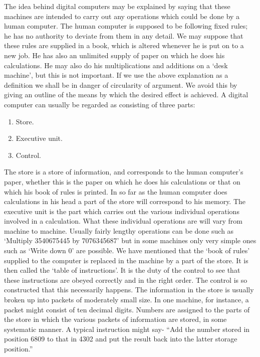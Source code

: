 \documentclass[10pt]{article} %
\begin{document}
The idea behind digital computers may be explained by saying that these machines are intended to carry out any operations which could be done by a human computer. The human computer is supposed to be following fixed rules; he has no authority to deviate from them in any detail. We may suppose that these rules are supplied in a book, which is altered whenever he is put on to a new job. He has also an unlimited supply of paper on which he does his calculations. He may also do his multiplications and additions on a `desk machine', but this is not important.
If we use the above explanation as a definition we shall be in danger of circularity of argument. We avoid this by giving an outline of the means by which the desired effect is achieved. A digital computer can usually be regarded as consisting of three parts:
\begin{enumerate}[label=(\roman*),itemsep=0pt]
    \item Store.
    \item Executive unit.
    \item Control.
\end{enumerate}
The store is a store of information, and corresponds to the human computer's paper, whether this is the paper on which he does his calculations or that on which his book of rules is printed. In so far as the human computer does calculations in his head a part of the store will correspond to his memory.
The executive unit is the part which carries out the various individual operations involved in a calculation. What these individual operations are will vary from machine to machine. Usually fairly lengthy operations can be done such as `Multiply 3540675445 by 7076345687' but in some machines only very simple ones such as `Write down 0' are possible.
We have mentioned that the `book of rules' supplied to the computer is replaced in the machine by a part of the store. It is then called the `table of instructions'. It is the duty of the control to see that these instructions are obeyed correctly and in the right order. The control is so constructed that this necessarily happens.
The information in the store is usually broken up into packets of moderately small size. In one machine, for instance, a packet might consist of ten decimal digits. Numbers are assigned to the parts of the store in which the various packets of information are stored, in some systematic manner. A typical instruction might say-
\vspace{0.2\baselineskip} %
``Add the number stored in position 6809 to that in 4302 and put the result back into the latter storage position.''\par %
\vspace{0.5\baselineskip} %
\end{document}
